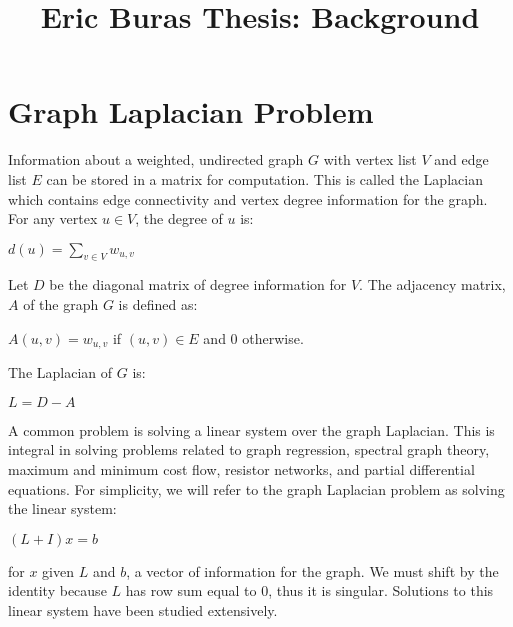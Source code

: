 \documentclass{article}
\begin{document}
\title{Eric Buras Thesis: Background}

\maketitle

\section{Graph Laplacian Problem}
Information about a weighted, undirected graph $G$ with vertex list $V$ and edge list $E$ can be stored in a matrix for computation. This is called the Laplacian which contains edge connectivity and vertex degree information for the graph. For any vertex $u \in V$, the degree of $u$ is:\\
\begin{center} $d(u) = \sum_{v \in V} w_{u,v}$ \cite{Spielman:2010} \\
\end{center}
Let $D$ be the diagonal matrix of degree information for $V$. The adjacency matrix, $A$ of the graph $G$ is defined as:\\
\begin{center} $A(u,v) = w_{u,v}$ if $(u,v) \in E$ and $0$ otherwise. \cite{Spielman:2010} \\
\end{center}
The Laplacian of $G$ is:\\
\begin{center} $L = D-A$ \cite{Spielman:2010} \\
\end{center}

A common problem is solving a linear system over the graph Laplacian. This is integral in solving problems related to graph regression, spectral graph theory, maximum and minimum cost flow, resistor networks, and partial differential equations. \cite{Spielman:2010} For simplicity, we will refer to the graph Laplacian problem as solving the linear system:\\
\begin{center} $(L+I)x = b$\\
\end{center}
for $x$ given $L$ and $b$, a vector of information for the graph. We must shift by the identity because $L$ has row sum equal to 0, thus it is singular. Solutions to this linear system have been studied extensively.
\end{document}

